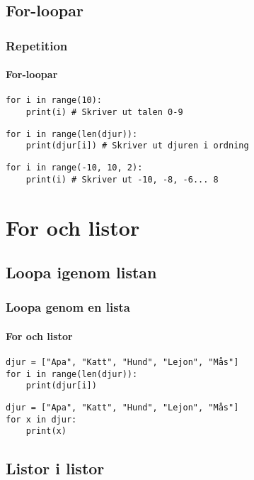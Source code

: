 \documentclass[aspectratio=169]{beamer}
\begin{document}
\subsection{For-loopar}

\begin{frame}[fragile]
	\frametitle{Repetition}
	\framesubtitle{For-loopar}
	
	\begin{lstlisting}
for i in range(10):
    print(i) # Skriver ut talen 0-9
	\end{lstlisting}
	
	\pause
	
	\begin{lstlisting}
for i in range(len(djur)):
    print(djur[i]) # Skriver ut djuren i ordning	
	\end{lstlisting}
	
	\pause
	
	\begin{lstlisting}
for i in range(-10, 10, 2):
    print(i) # Skriver ut -10, -8, -6... 8
	\end{lstlisting}
	
\end{frame}

\section{For och listor}

\subsection{Loopa igenom listan}

\begin{frame}[fragile]
	\frametitle{Loopa genom en lista}
	\framesubtitle{For och listor}
	
	\begin{lstlisting}
djur = ["Apa", "Katt", "Hund", "Lejon", "Mås"]
for i in range(len(djur)):
    print(djur[i])
	\end{lstlisting}
	
	\pause
	
	\begin{lstlisting}
djur = ["Apa", "Katt", "Hund", "Lejon", "Mås"]
for x in djur:
    print(x)
	\end{lstlisting}
	
\end{frame}

\subsection{Listor i listor}
\end{document}
